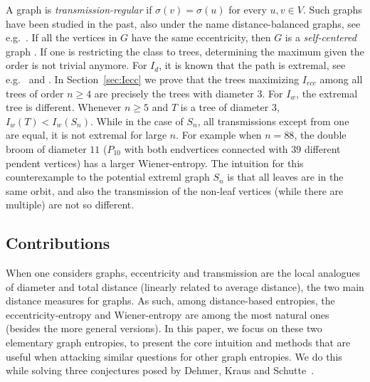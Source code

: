 \documentclass{article}
\newtheorem{conj}[defi]{Conjecture}
\newcommand{\ecc}{ecc}
\begin{document}
{A graph is {\em transmission-regular} if $\sigma(v)=\sigma(u)$ for every $u,v \in V.$ Such graphs have been studied in the past, also under the name distance-balanced graphs, see e.g.~\cite{Abiad_etal17,Bala_etal09,Handa99}. If all the vertices in $G$ have the same eccentricity,
then $G$ is a {\em self-centered} graph \cite{MR1110802}.
If one is restricting the class to trees, determining the maximum given the order is not trivial anymore.
For $I_d$, it is known that the path is extremal, see e.g.~\cite[Thm. 1]{CaoMR3212009} and \cite[Prop.7]{CM22+}.
In Section~\ref{sec:Iecc} we prove that the trees maximizing $I_{\ecc}$ among all trees of order $n \ge 4$ are precisely the trees with diameter $3.$
For $I_w$, the extremal tree is different. Whenever $n \ge 5$ and $T$ is a tree of diameter $3$, $I_w(T)<I_w(S_n)$.
While in the case of $S_n$, all transmissions except from one are equal, it is not extremal for large $n$.
For example when $n=88$, the double broom of diameter $11$ ($P_{10}$ with both endvertices connected with $39$ different pendent vertices) has a larger Wiener-entropy.
The intuition for this counterexample to the potential extreml graph $S_n$ is that all leaves are in the same orbit, and also the transmission of the non-leaf vertices (while there are multiple) are not so different.




\subsection{Contributions}\label{subsec:contrib}


When one considers graphs, eccentricity and transmission are the local analogues of diameter and total distance (linearly related to average distance), the two main distance measures for graphs.
As such, among distance-based entropies, the eccentricity-entropy and Wiener-entropy are among the most natural ones (besides the more general versions).
In this paper, we focus on these two elementary graph entropies, to present the core intuition and methods that are useful when attacking similar questions for other graph entropies. We do this while solving three conjectures posed by Dehmer, Kraus and Schutte~\cite{Dehmer_Kraus,KDM13}.

}
\end{document}
